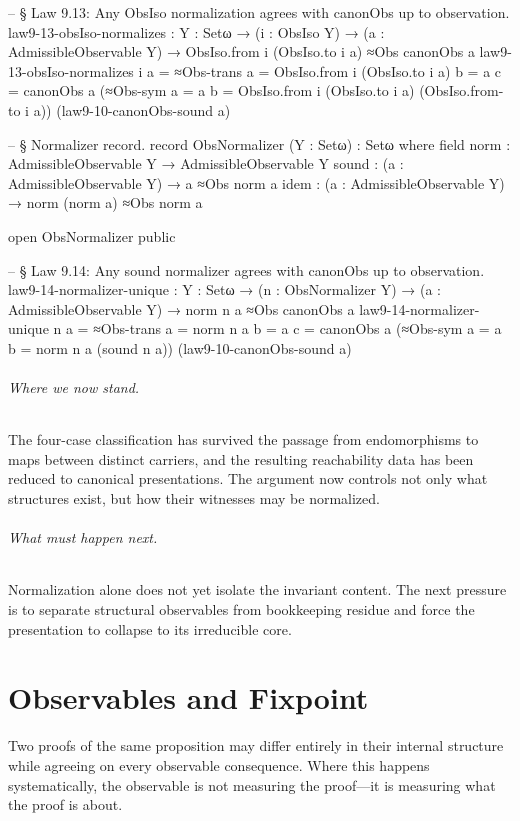 \documentclass[11pt,a4paper]{book}
\begin{document}
\begin{code}
-- § Law 9.13: Any ObsIso normalization agrees with canonObs up to observation.
law9-13-obsIso-normalizes :
  {Y : Setω} →
  (i : ObsIso Y) →
  (a : AdmissibleObservable Y) →
  ObsIso.from i (ObsIso.to i a) ≈Obs canonObs a
law9-13-obsIso-normalizes i a =
  ≈Obs-trans
    {a = ObsIso.from i (ObsIso.to i a)}
    {b = a}
    {c = canonObs a}
    (≈Obs-sym {a = a} {b = ObsIso.from i (ObsIso.to i a)} (ObsIso.from-to i a))
    (law9-10-canonObs-sound a)

-- § Normalizer record.
record ObsNormalizer (Y : Setω) : Setω where
  field
    norm  : AdmissibleObservable Y → AdmissibleObservable Y
    sound : (a : AdmissibleObservable Y) → a ≈Obs norm a
    idem  : (a : AdmissibleObservable Y) → norm (norm a) ≈Obs norm a

open ObsNormalizer public

-- § Law 9.14: Any sound normalizer agrees with canonObs up to observation.
law9-14-normalizer-unique :
  {Y : Setω} →
  (n : ObsNormalizer Y) →
  (a : AdmissibleObservable Y) →
  norm n a ≈Obs canonObs a
law9-14-normalizer-unique n a =
  ≈Obs-trans
    {a = norm n a}
    {b = a}
    {c = canonObs a}
    (≈Obs-sym {a = a} {b = norm n a} (sound n a))
    (law9-10-canonObs-sound a)
\end{code}

\paragraph{Where we now stand.}
The four-case classification has survived the passage from endomorphisms to maps between distinct carriers, and the resulting reachability data has been reduced to canonical presentations. The argument now controls not only what structures exist, but how their witnesses may be normalized.

\paragraph{What must happen next.}
Normalization alone does not yet isolate the invariant content. The next pressure is to separate structural observables from bookkeeping residue and force the presentation to collapse to its irreducible core.

\part{Observables and Fixpoint}

Two proofs of the same proposition may differ entirely in their internal structure while agreeing on every observable consequence. Where this happens systematically, the observable is not measuring the proof---it is measuring what the proof is about.
\end{document}
